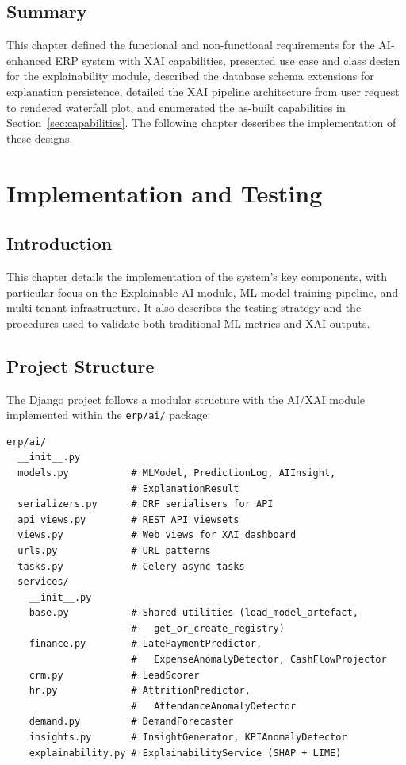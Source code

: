 \documentclass[12pt,a4paper]{report}
\begin{document}
\section{Summary}
\label{sec:ad_summary}

This chapter defined the functional and non-functional requirements for the AI-enhanced ERP system with XAI capabilities, presented use case and class design for the explainability module, described the database schema extensions for explanation persistence, detailed the XAI pipeline architecture from user request to rendered waterfall plot, and enumerated the as-built capabilities in Section~\ref{sec:capabilities}. The following chapter describes the implementation of these designs.


%
%
\chapter{Implementation and Testing}
\label{ch:implementation}

\section{Introduction}
\label{sec:impl_intro}

This chapter details the implementation of the system's key components, with particular focus on the Explainable AI module, ML model training pipeline, and multi-tenant infrastructure. It also describes the testing strategy and the procedures used to validate both traditional ML metrics and XAI outputs.

\section{Project Structure}
\label{sec:project_structure}

The Django project follows a modular structure with the AI/XAI module implemented within the \texttt{erp/ai/} package:

\begin{lstlisting}[caption={AI module directory structure},label={lst:ai_structure}]
erp/ai/
  __init__.py
  models.py           # MLModel, PredictionLog, AIInsight,
                      # ExplanationResult
  serializers.py      # DRF serialisers for API
  api_views.py        # REST API viewsets
  views.py            # Web views for XAI dashboard
  urls.py             # URL patterns
  tasks.py            # Celery async tasks
  services/
    __init__.py
    base.py           # Shared utilities (load_model_artefact,
                      #   get_or_create_registry)
    finance.py        # LatePaymentPredictor,
                      #   ExpenseAnomalyDetector, CashFlowProjector
    crm.py            # LeadScorer
    hr.py             # AttritionPredictor,
                      #   AttendanceAnomalyDetector
    demand.py         # DemandForecaster
    insights.py       # InsightGenerator, KPIAnomalyDetector
    explainability.py # ExplainabilityService (SHAP + LIME)
\end{lstlisting}
\end{document}
